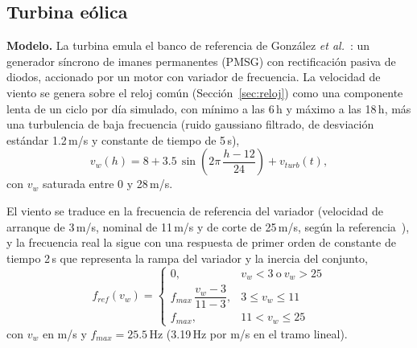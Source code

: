 \documentclass[conference]{IEEEtran}
\begin{document}
\subsection{Turbina eólica}
\label{sec:modelo_eolica}

\textbf{Modelo.} La turbina emula el banco de referencia de González \emph{et al.}~\cite{gonzalez2026eolica}: un generador síncrono de imanes permanentes (PMSG) con rectificación pasiva de diodos, accionado por un motor con variador de frecuencia. La velocidad de viento se genera sobre el reloj común (Sección~\ref{sec:reloj}) como una componente lenta de un ciclo por día simulado, con mínimo a las 6\,h y máximo a las 18\,h, más una turbulencia de baja frecuencia (ruido gaussiano filtrado, de desviación estándar 1.2\,m/s y constante de tiempo de 5\,s),
\begin{equation}
\label{eq:wind_v}
v_w(h) = 8 + 3.5\,\sin\!\left(2\pi\,\frac{h-12}{24}\right) + v_{turb}(t),
\end{equation}
con $v_w$ saturada entre 0 y 28\,m/s.

El viento se traduce en la frecuencia de referencia del variador (velocidad de arranque de 3\,m/s, nominal de 11\,m/s y de corte de 25\,m/s, según la referencia~\cite{gonzalez2026eolica}), y la frecuencia real la sigue con una respuesta de primer orden de constante de tiempo 2\,s que representa la rampa del variador y la inercia del conjunto,
\begin{equation}
\label{eq:wind_f}
f_{ref}(v_w) = \begin{cases}
0, & v_w < 3 \ \text{o} \ v_w > 25 \\[2pt]
f_{max}\,\dfrac{v_w-3}{11-3}, & 3 \le v_w \le 11 \\[6pt]
f_{max}, & 11 < v_w \le 25
\end{cases}
\end{equation}
con $v_w$ en m/s y $f_{max}=25.5$\,Hz (3.19\,Hz por m/s en el tramo lineal).
\end{document}
